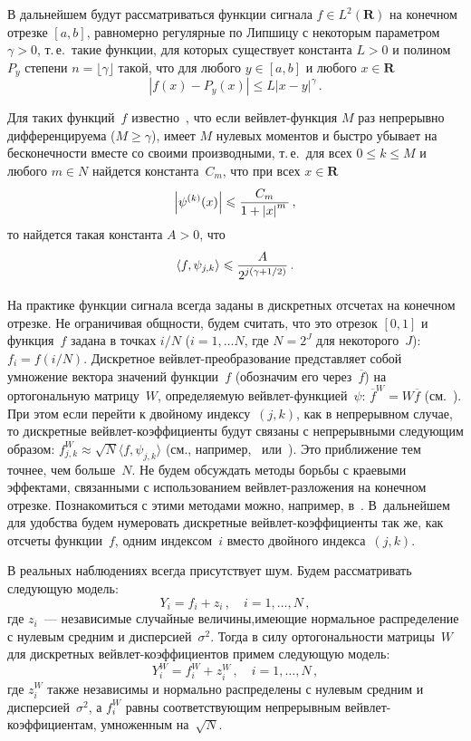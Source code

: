 \begin{multicols}{2}
В дальнейшем будут рассматриваться функции сигнала $f\in L^2(\mathbf{R})$ на конечном отрезке $[a,b]$, 
равномерно регулярные по Липшицу с некоторым параметром $\gamma>0$, т.\,е.\ 
такие функции, для которых существует константа $L>0$ и полином $P_y$ степени 
$n=\lfloor\gamma\rfloor$ такой, что для любого $y\in[a,b]$ и любого $x\in\mathbf{R}$
$$
\left\vert f(x)-P_y(x)\right\vert\leqslant L\left\vert x-y\right\vert^\gamma\,.
$$

Для таких функций~$f$ известно~\cite{9she}, что если вейвлет-функция $M$ раз непрерывно 
дифференцируема ($M\geqslant\gamma$), имеет $M$ нулевых моментов и быстро убывает на бесконечности 
вместе со своими производными, т.\,е.\ для всех $0\leqslant k \leqslant M$ и любого $m\in N$ найдется константа~$C_m$, 
что при всех $x\in\mathbf{R}$
$$
\left\vert\psi^{(k)}(x)\right\vert\leqslant\displaystyle\frac{\displaystyle C_m\mathstrut}{\displaystyle 1+\left\vert x\right\vert^m\mathstrut}\,,
$$
то найдется такая константа $A>0$, что
\begin{equation}
\langle f,\psi_{j,k}\rangle\leqslant\displaystyle\frac{\displaystyle A\mathstrut}{\displaystyle 2^{j\left(\gamma+{1}/{2}\right)}\mathstrut}\,.
\label{e2she}
\end{equation}

На практике функции сигнала всегда заданы в дискретных отсчетах на конечном отрезке. 
Не ограничивая общности, будем считать, что это отрезок $[0,1]$ и функция~$f$ задана в 
точках ${i}/{N}$ ($i=1,\ldots N$, где $N=2^J$ для некоторого~$J$): $f_i=f\left({i}/{N}\right)$.
Дискретное вейвлет-преобразование представляет собой умножение вектора значений функции~$f$ 
(обозначим его через~$\overline{f}$) на ортогональную матрицу~$W$, определяемую вейвлет-функцией~$\psi$: 
$\overline{f}^{W}=W\overline{f}$ (см.~\cite{9she}). При этом если перейти к двойному индексу~$(j,k)$, 
как в непрерывном случае, то дискретные вейвлет-коэффициенты будут связаны с непрерывными следующим образом: 
$f^{W}_{j,k}\approx \sqrt{N}\langle f,\psi_{j,k}\rangle$ (см., например,~\cite{1she} или~\cite{10she}). 
Это приближение тем точнее, чем больше~$N$. Не будем обсуждать методы борьбы с краевыми эффектами, 
связанными с использованием вейвлет-разложения на конечном отрезке. Познакомиться с этими методами можно, 
например, в~\cite{11she}. В~дальнейшем для удобства будем нумеровать дискретные вейвлет-коэффициенты так же, 
как отсчеты функции~$f$, одним индексом~$i$ вместо двойного индекса~$(j,k)$.

В реальных наблюдениях всегда присутствует шум. Будем рассматривать следующую модель:
$$
Y_i=f_i+z_i\,,\quad i=1,\ldots,N\,,
$$
где $z_i$~--- независимые случайные величины,\linebreak име\-ющие нормальное распределение с нулевым средним и 
дисперсией~$\sigma^2$. Тогда в силу ортогональности матрицы~$W$ для дискретных вейвлет-коэффициентов 
примем следующую модель:
$$
Y^W_i=f^{W}_{i}+z^W_i\,,\quad i=1,\ldots,N\,,
$$
где $z^W_i$ так\-же независимы и нормально распределены с нулевым средним и дисперсией~$\sigma^2$, а $f^{W}_{i}$ равны 
соответствующим непрерывным вейвлет-ко\-эф\-фи\-ци\-ен\-там, умноженным на~$\sqrt{N}$.


\end{multicols}
